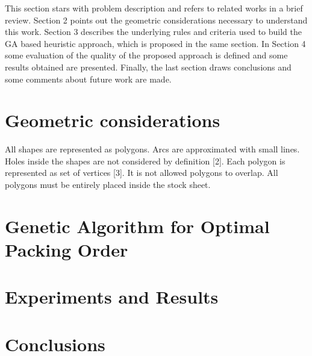 \documentclass{llncs}
\begin{document}
This section stars with problem description and refers to related works in a brief review. Section 2 points out the geometric considerations necessary to understand
this work. Section 3 describes the underlying rules and criteria used to build the GA based heuristic approach, which is proposed in the same section. In Section 4 some evaluation of the quality of the proposed approach is defined and some results obtained are presented. Finally, the last section draws conclusions and some comments about future work are made.
%
\section{Geometric considerations}
%
All shapes are represented as polygons. Arcs are approximated with small lines. Holes inside the shapes are not considered by definition [2]. Each polygon
is represented as set of vertices [3]. It is not allowed polygons to overlap. All polygons must be entirely placed inside the stock sheet.
%
\section{Genetic Algorithm for Optimal Packing Order}
%
%
\section{Experiments and Results}
%
%
\section{Conclusions}
%
%
\end{document}
